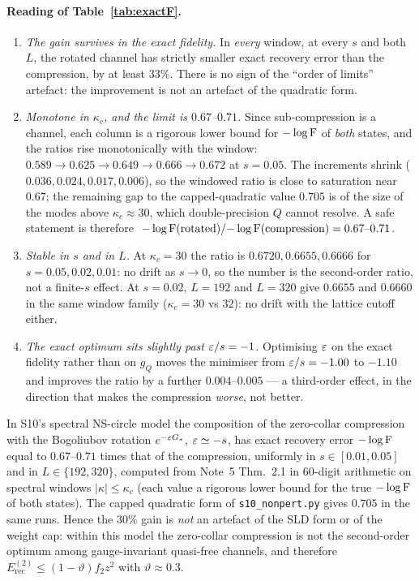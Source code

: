 \documentclass[11pt]{article}
\newcommand{\Erec}{E_{\mathrm{rec}}}
\begin{document}
\paragraph{Reading of Table~\ref{tab:exactF}.}
\begin{enumerate}[leftmargin=1.6em,itemsep=2pt]
\item \emph{The gain survives in the exact fidelity.}  In \emph{every} window, at every $s$ and
both $L$, the rotated channel has strictly smaller exact recovery error than the compression, by
at least $33\%$.  There is no sign of the ``order of limits'' artefact: the improvement is not an
artefact of the quadratic form.
\item \emph{Monotone in $\kappa_c$, and the limit is $0.67$--$0.71$.}  Since sub-compression is a
channel, each column is a rigorous lower bound for $-\log\operatorname{F}$ of \emph{both} states, and the
ratios rise monotonically with the window: $0.589\to0.625\to0.649\to0.666\to0.672$ at $s=0.05$.
The increments shrink ($0.036,0.024,0.017,0.006$), so the windowed ratio is close to saturation
near $0.67$; the remaining gap to the capped-quadratic value $0.705$ is of the size of the
modes above $\kappa_c\approx30$, which double-precision $Q$ cannot resolve.  A safe statement is
therefore \(\;-\log\operatorname{F}(\text{rotated})/{-\log\operatorname{F}}(\text{compression})=0.67\text{--}0.71\).
\item \emph{Stable in $s$ and in $L$.}  At $\kappa_c=30$ the ratio is $0.6720,0.6655,0.6666$ for
$s=0.05,0.02,0.01$: no drift as $s\to0$, so the number is the second-order ratio, not a
finite-$s$ effect.  At $s=0.02$, $L=192$ and $L=320$ give $0.6655$ and $0.6660$ in the same window
family ($\kappa_c=30$ vs $32$): no drift with the lattice cutoff either.
\item \emph{The exact optimum sits slightly past $\varepsilon/s=-1$.}  Optimising $\varepsilon$ on the exact
fidelity rather than on $g_Q$ moves the minimiser from $\varepsilon/s=-1.00$ to $-1.10$ and improves the
ratio by a further $0.004$--$0.005$ --- a third-order effect, in the direction that makes the
compression \emph{worse}, not better.
\end{enumerate}

\begin{verdictbreak}
In S10's spectral NS-circle model the composition of the zero-collar compression with the
Bogoliubov rotation $e^{-\varepsilon G_*}$, $\varepsilon\simeq-s$, has exact recovery error
$-\log\operatorname{F}$ equal to $0.67$--$0.71$ times that of the compression, uniformly in $s\in[0.01,0.05]$
and in $L\in\{192,320\}$, computed from Note~5 Thm.~2.1 in $60$-digit arithmetic on spectral
windows $|\kappa|\le\kappa_c$ (each value a rigorous lower bound for the true $-\log\operatorname{F}$ of both
states).  The capped quadratic form of \texttt{s10\_nonpert.py} gives $0.705$ in the same runs.
Hence the $30\%$ gain is \emph{not} an artefact of the SLD form or of the weight cap: within this
model the zero-collar compression is not the second-order optimum among gauge-invariant
quasi-free channels, and therefore $\Erec^{(2)}\le(1-\vartheta)f_2z^2$ with $\vartheta\approx0.3$.
\end{verdictbreak}
\end{document}
